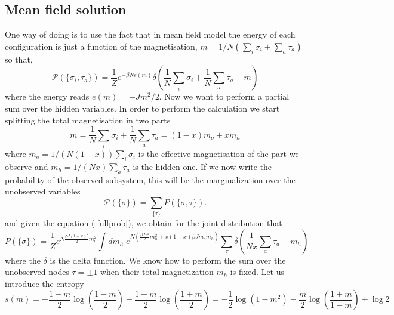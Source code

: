 \documentclass[aps,pre,noshowpacs]{revtex4}
\begin{document}
\subsection{Mean field solution}

One way of doing is to use the fact that in mean field model  the energy of each configuration is just a function of the
magnetisation, $m=1/N(\sum_i \sigma_i +\sum_a \tau_a)$ so that, 
\begin{equation}\label{fullprob}
\mathcal{P}(\{\sigma_i, \tau_a\}) =  \frac{1}{Z} e^{-\beta N e(m)} \delta\left(\frac{1}{N} \sum_i \sigma_i + \frac{1}{N}\sum_a\tau_a-m \right)
\end{equation}
where the energy reads $e(m)=-J m^2/2$. Now we want to perform a partial sum
over the hidden variables.
In order to perform the calculation we start splitting the total magnetisation in two parts 
\begin{equation}\label{mag}
m= \frac{1}{N} \sum_{i } \sigma_i + \frac{1}{N}\sum_{a } \tau_a = (1-x) m_o + x m_h
\end{equation}
where $m_o=1/(N (1-x)) \sum_{i }\sigma_i $ is the effective magnetisation of the part we observe and $m_h= 1/(Nx)\sum_{a} \tau_a $ is the hidden one.
If we now write the probability of the observed subsystem, this will be the marginalization over the unobserved variables
\begin{equation}\label{subsytempdf}
\mathcal{P}(\{ \sigma\}) = \sum_{\{\tau\}} P(\{\sigma,\tau\}).
\end{equation}
and given the equation (\ref{fullprob}), we obtain for the joint distribution that
\begin{equation}\label{probmarg}
P(\{\sigma\}) = \frac{1}{Z}e^{N  \frac{\beta J (1-x)^2 }{2} m_o^2} \int dm_h \; e^{N \left( \frac{\beta J x^2}{2} m_h^2 +  x (1-x) \beta J m_o m_h \right)}\sum_{\tau}  \delta\left(\frac{1}{N x}\sum_{a} \tau_a-m_h\right)
\end{equation}
where the $\delta$ is the delta function. We know how to perform the sum over the unobserved nodes $\tau=\pm1$ when their total magnetization $m_h$ is fixed. Let us introduce the entropy
\begin{equation}\label{entropy}
s(m)=-\frac{1-m}{2}\log\left(\frac{1-m}{2}\right)-\frac{1+m}{2}\log\left(\frac{1+m}{2}\right)=-\frac{1}{2}\log\left(1-m^2\right) - \frac{m}{2} \log\left(\frac{1+m}{1-m} \right)+ \log2
\end{equation}
\end{document}
